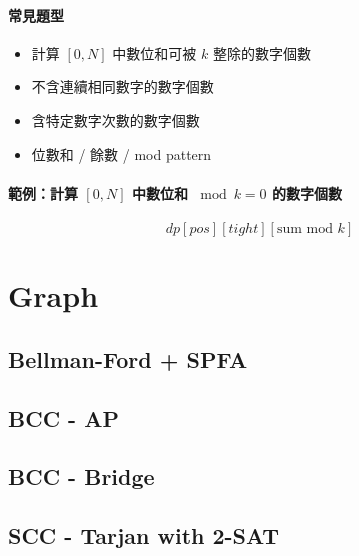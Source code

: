 \documentclass[a4paper,10pt,twocolumn,oneside]{article}
\begin{document}
\paragraph{常見題型}
\begin{itemize}[nolistsep]
    \item 計算 $[0,N]$ 中數位和可被 $k$ 整除的數字個數
    \item 不含連續相同數字的數字個數
    \item 含特定數字次數的數字個數
    \item 位數和 / 餘數 / mod pattern
\end{itemize}

\paragraph{範例：計算 $[0,N]$ 中數位和 $\bmod k = 0$ 的數字個數}

\[
    dp[pos][tight][\text{sum mod } k]
\]




\section{Graph}

% 

\subsection{Bellman-Ford + SPFA}


\subsection{BCC - AP}


\subsection{BCC - Bridge}


\subsection{SCC - Tarjan with 2-SAT}

\end{document}
